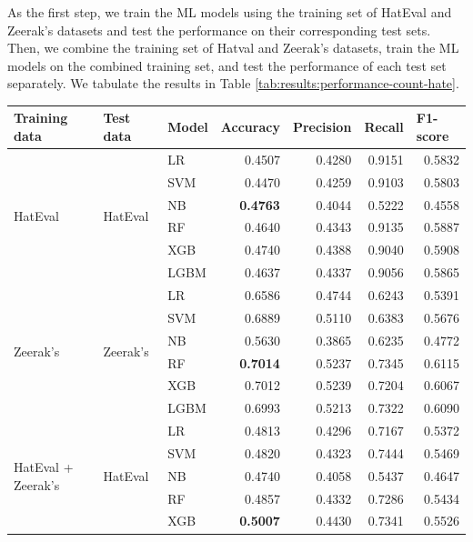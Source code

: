 As the first step, we train the ML models using the training set of HatEval and Zeerak's datasets and test the performance on their corresponding test sets. Then, we combine the training set of Hatval and Zeerak's datasets, train the ML models on the combined training set, and test the performance of each test set separately. We tabulate the results in Table \ref{tab:results:performance-count-hate}. 


\begin{table}[htbp]
\centering
\begin{tabular}{p{2cm}p{2cm}lrrrr}
\hline
\textbf{Training data} & \textbf{Test data} & \textbf{Model} & \multicolumn{1}{l}{\textbf{Accuracy}} & \multicolumn{1}{l}{\textbf{Precision}} & \multicolumn{1}{l}{\textbf{Recall}} & \multicolumn{1}{l}{\textbf{F1-score}} \\
\hline
\multirow{6}{*}{HatEval} & \multirow{6}{*}{HatEval} & LR & 0.4507 & 0.4280 & 0.9151 & 0.5832 \\
 &  & SVM & 0.4470 & 0.4259 & 0.9103 & 0.5803 \\
 &  & NB & \textbf{0.4763} & 0.4044 & 0.5222 & 0.4558 \\
 &  & RF & 0.4640 & 0.4343 & 0.9135 & 0.5887 \\
 &  & XGB & 0.4740 & 0.4388 & 0.9040 & 0.5908 \\
 &  & LGBM & 0.4637 & 0.4337 & 0.9056 & 0.5865 \\ \hline
\multirow{6}{*}{Zeerak's} & \multirow{6}{*}{Zeerak's} & LR & 0.6586 & 0.4744 & 0.6243 & 0.5391 \\
 &  & SVM & 0.6889 & 0.5110 & 0.6383 & 0.5676 \\
 &  & NB & 0.5630 & 0.3865 & 0.6235 & 0.4772 \\
 &  & RF & \textbf{0.7014} & 0.5237 & 0.7345 & 0.6115 \\
 &  & XGB & 0.7012 & 0.5239 & 0.7204 & 0.6067 \\
 &  & LGBM & 0.6993 & 0.5213 & 0.7322 & 0.6090 \\ \hline
\multirow{6}{*}{\parbox{2cm}{HatEval + Zeerak's}} & \multirow{6}{*}{HatEval} & LR & 0.4813 & 0.4296 & 0.7167 & 0.5372 \\
 &  & SVM & 0.4820 & 0.4323 & 0.7444 & 0.5469 \\
 &  & NB & 0.4740 & 0.4058 & 0.5437 & 0.4647 \\
 &  & RF & 0.4857 & 0.4332 & 0.7286 & 0.5434 \\
 &  & XGB & \textbf{0.5007} & 0.4430 & 0.7341 & 0.5526 \\

\end{tabular}
\end{table}
